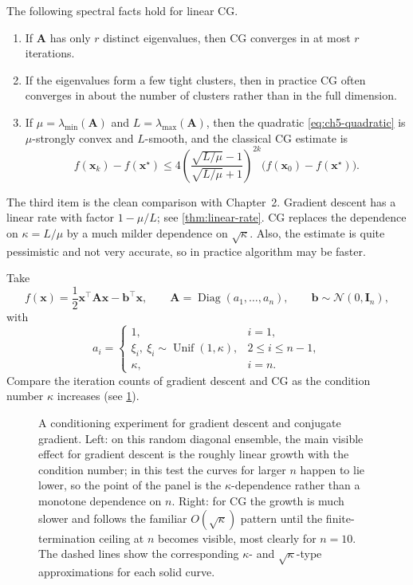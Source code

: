 \begin{theorem}
\label{thm:ch5-spectral-properties}
The following spectral facts hold for linear CG.
\begin{enumerate}
  \item If $\mathbf{A}$ has only $r$ distinct eigenvalues, then CG converges in
  at most $r$ iterations.
  \item If the eigenvalues form a few tight clusters, then in practice CG often
  converges in about the number of clusters rather than in the full dimension.
  \item If $\mu=\lambda_{\min}(\mathbf{A})$ and $L=\lambda_{\max}(\mathbf{A})$,
  then the quadratic \eqref{eq:ch5-quadratic} is $\mu$-strongly convex and
  $L$-smooth, and the classical CG estimate is
  \[
    f(\mathbf{x}_k)-f(\mathbf{x}^\star)
    \le 4
    \left(\frac{\sqrt{L/\mu}-1}{\sqrt{L/\mu}+1}\right)^{2k}
    \bigl(f(\mathbf{x}_0)-f(\mathbf{x}^\star)\bigr).
  \]
 \end{enumerate}
\end{theorem}

The third item is the clean comparison with Chapter~2. Gradient descent has a
linear rate with factor $1-\mu/L$; see \cref{thm:linear-rate}. CG replaces the
dependence on $\kappa=L/\mu$ by a much milder dependence on $\sqrt{\kappa}$.  
Also,
the estimate is quite pessimistic and not very accurate, so in practice algorithm
may be faster.

\begin{example}
Take
\[
  f(\mathbf{x})=\frac12 \mathbf{x}^{\top}\mathbf{A}\mathbf{x}
  -\mathbf{b}^{\top}\mathbf{x},
  \qquad
  \mathbf{A}=\operatorname{Diag}(a_1,\ldots,a_n),
  \qquad
  \mathbf{b}\sim \mathcal{N}(0,\mathbf{I}_n),
\]
with
\[
  a_i=
  \begin{cases}
    1, & i=1,\\
    \xi_i,\ \xi_i\sim \operatorname{Unif}(1,\kappa), & 2\le i\le n-1,\\
    \kappa, & i=n.
  \end{cases}
\]
Compare the iteration counts of gradient descent and CG as the condition number
$\kappa$ increases (see \cref{fig:ch5-linear-cg-behaviour}).
\end{example}

\begin{figure}[ht]
  \centering
  \caption{A conditioning experiment for gradient descent and conjugate
  gradient. Left: on this random diagonal ensemble, the main visible effect for
  gradient descent is the roughly linear growth with the condition number; in
  this test the curves for larger $n$ happen to lie lower, so the point of the
  panel is the $\kappa$-dependence rather than a monotone dependence on $n$.
  Right: for CG the growth is much slower and follows the familiar
  $O(\sqrt{\kappa})$ pattern until the finite-termination ceiling at $n$
  becomes visible, most clearly for $n=10$. The dashed lines show the
  corresponding $\kappa$- and $\sqrt{\kappa}$-type approximations for each
  solid curve.}
  \label{fig:ch5-linear-cg-behaviour}
\end{figure}

